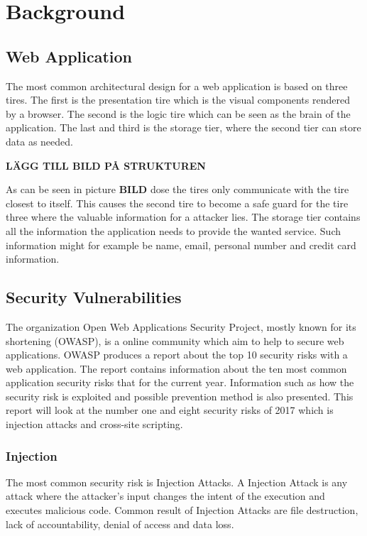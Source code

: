 \chapter{Background}



\section{Web Application}
The most common architectural design for a web application is based on three tires. The first is the presentation tire which is the visual components rendered by a browser. The second is the logic tire which can be seen as the brain of the application. The last and third is the storage tier, where the second tier can store data as needed. \parencite{JustinClarke-Salt2009SIAa} 

\textbf{LÄGG TILL BILD PÅ STRUKTUREN}

As can be seen in picture \textbf{BILD} dose the tires only communicate with the tire closest to itself. This causes the second tire to become a safe guard for the tire three where the valuable information for a attacker lies. The storage tier contains all the information the application needs to provide the wanted service. Such information might for example be name, email, personal number and credit card information. \parencite{JustinClarke-Salt2009SIAa}

\section{Security Vulnerabilities}
The organization Open Web Applications Security Project, mostly known for its shortening (OWASP), is a online community which aim to help to secure web applications. \parencite{OpenWebApplicationSecurityProject} OWASP produces a report about the top 10 security risks with a web application. The report contains information about the ten most common application security risks that for the current year. Information such as how the security risk is exploited and possible prevention method is also presented. \parencite{OWASP2017} This report will look at the number one and eight security risks of 2017 which is injection attacks and cross-site scripting. \parencite{OWASP2017}


\subsection{Injection}
The most common security risk is Injection Attacks. \parencite{OWASP2017} A Injection Attack is any attack where the attacker's input changes the intent of the execution and executes malicious code. Common result of Injection Attacks are file destruction, lack of accountability, denial of access and data loss. \parencite{Secure_Web}

